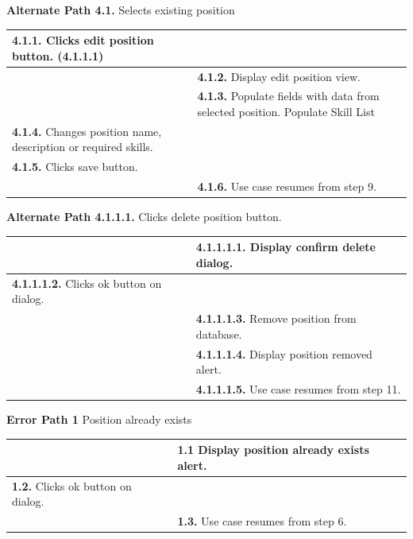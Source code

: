 \documentclass[letterpaper,12pt]{report}
\begin{document}
{\begin{center}
\begin{tabular}{| p{8.5cm} | p{8.5cm} |}
\end{tabular}
\end{center}
\pagebreak
\centering \textbf{Alternate Path 4.1.}
\linebreak Selects existing position
\begin{center}
\xuchead
\begin{tabular}{| p{8.5cm} | p{8.5cm} |}
\hline
\textbf{4.1.1.} Clicks edit position button. (4.1.1.1) & \\
\hline
& \textbf{4.1.2.} Display edit position view. \\
\hline
& \textbf{4.1.3.} Populate fields with data from selected position. Populate Skill List \\
\hline
\textbf{4.1.4.} Changes position name, description or required skills. &\\
\hline
\textbf{4.1.5.} Clicks save button. &\\
\hline
& \textbf{4.1.6.} Use case resumes from step 9. \\
\hline
\end{tabular}
\end{center}
\pagebreak
\centering \textbf{Alternate Path 4.1.1.1.}
\linebreak Clicks delete position button.
\begin{center}
\xuchead
\begin{tabular}{| p{8.5cm} | p{8.5cm} |}
\hline
& \textbf{4.1.1.1.1.} Display confirm delete dialog. \\
\hline
\textbf{4.1.1.1.2.} Clicks ok button on dialog. & \\
\hline
& \textbf{4.1.1.1.3.} Remove position from database. \\
\hline
& \textbf{4.1.1.1.4.} Display position removed alert. \\
\hline
& \textbf{4.1.1.1.5.} Use case resumes from step 11. \\
\hline
\end{tabular}
\end{center}
\centering \textbf{Error Path 1}
\linebreak Position already exists
\begin{center}
\xuchead
\begin{tabular}{| p{8.5cm} | p{8.5cm} |}
\hline
& \textbf{1.1} Display position already exists alert. \\
\hline
\textbf{1.2.} Clicks ok button on dialog. & \\
\hline
& \textbf{1.3.} Use case resumes from step 6. \\
\hline
\end{tabular}
\end{center}

}
\end{document}

